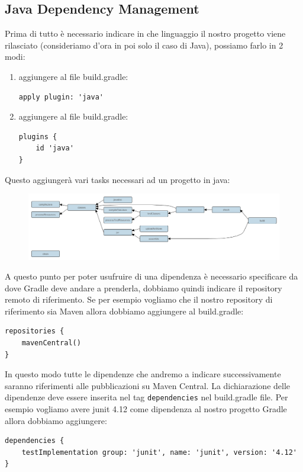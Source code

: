 \subsection{Java Dependency Management}
Prima di tutto è necessario indicare in che linguaggio il nostro progetto viene rilasciato (consideriamo d'ora in poi solo il caso di Java), possiamo farlo in 2 modi:
\begin{enumerate}
    \item aggiungere al file build.gradle:
    \begin{lstlisting}[frame=single]
apply plugin: 'java' \end{lstlisting}
    \item aggiungere al file build.gradle:
    \begin{lstlisting}[frame=single]
plugins {
    id 'java'
}
    \end{lstlisting}
\end{enumerate}
Questo aggiungerà vari tasks necessari ad un progetto in java:
\begin{figure}[H]
    \centering
    \includegraphics[width=1.0\linewidth]{3DependencyManagement/javaDep/javaPluginTasks.png}
    \label{fig:my_label}
\end{figure}
A questo punto per poter usufruire di una dipendenza è necessario specificare da dove Gradle deve andare a prenderla, dobbiamo quindi indicare il repository remoto di riferimento. Se per esempio vogliamo che il nostro repository di riferimento sia Maven allora dobbiamo aggiungere al build.gradle:
\begin{lstlisting}[frame=single]
repositories {
    mavenCentral()
} \end{lstlisting}
In questo modo tutte le dipendenze che andremo a indicare successivamente saranno riferimenti alle pubblicazioni su Maven Central. La dichiarazione delle dipendenze deve essere inserita nel tag \texttt{dependencies} nel build.gradle file. Per esempio vogliamo avere junit 4.12 come dipendenza al nostro progetto Gradle allora dobbiamo aggiungere:
\begin{lstlisting}[frame=single]
dependencies {
    testImplementation group: 'junit', name: 'junit', version: '4.12' 
} \end{lstlisting}
